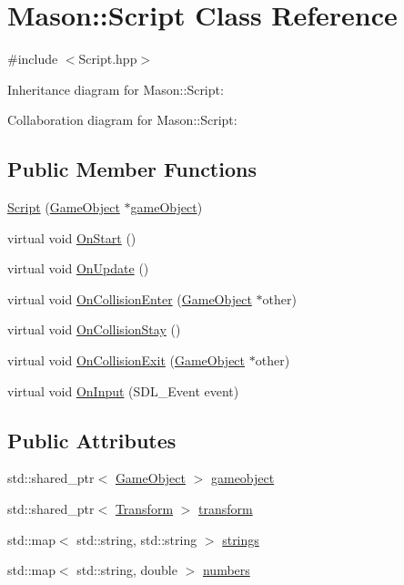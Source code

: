 \hypertarget{class_mason_1_1_script}{}\section{Mason\+:\+:Script Class Reference}
\label{class_mason_1_1_script}


{\ttfamily \#include $<$Script.\+hpp$>$}



Inheritance diagram for Mason\+:\+:Script\+:


Collaboration diagram for Mason\+:\+:Script\+:
\subsection*{Public Member Functions}
\begin{DoxyCompactItemize}
\item 
\hyperlink{class_mason_1_1_script_a11d07693e51f3e22894784a6ae7a761d}{Script} (\hyperlink{class_mason_1_1_game_object}{Game\+Object} $\ast$\hyperlink{class_mason_1_1_component_a30030370c35f5562cbbbb0927b0448c8}{game\+Object})
\item 
virtual void \hyperlink{class_mason_1_1_script_aa42915c752bb7f4623ca679b222edf2f}{On\+Start} ()
\item 
virtual void \hyperlink{class_mason_1_1_script_acafa4283460fb677484bb43ebec37743}{On\+Update} ()
\item 
virtual void \hyperlink{class_mason_1_1_script_a1088013d6edc47d74643aa48a7cbbbdf}{On\+Collision\+Enter} (\hyperlink{class_mason_1_1_game_object}{Game\+Object} $\ast$other)
\item 
virtual void \hyperlink{class_mason_1_1_script_a9649674f058f8e1b9229e93f3d9a34d7}{On\+Collision\+Stay} ()
\item 
virtual void \hyperlink{class_mason_1_1_script_a04d09648b7dba1bcb0a0ad3c3570e2f3}{On\+Collision\+Exit} (\hyperlink{class_mason_1_1_game_object}{Game\+Object} $\ast$other)
\item 
virtual void \hyperlink{class_mason_1_1_script_a84fff8072c4e8b56fb242b29f3491224}{On\+Input} (S\+D\+L\+\_\+\+Event event)
\end{DoxyCompactItemize}
\subsection*{Public Attributes}
\begin{DoxyCompactItemize}
\item 
std\+::shared\+\_\+ptr$<$ \hyperlink{class_mason_1_1_game_object}{Game\+Object} $>$ \hyperlink{class_mason_1_1_script_a26ffab9ad2a0f22cb6a3cba3029a985f}{gameobject}
\item 
std\+::shared\+\_\+ptr$<$ \hyperlink{class_mason_1_1_transform}{Transform} $>$ \hyperlink{class_mason_1_1_script_a480aa8b8f65245d51e41ceeaf9cab93a}{transform}
\item 
std\+::map$<$ std\+::string, std\+::string $>$ \hyperlink{class_mason_1_1_script_a96f691d0ccd8db2e3e95824e8579cc42}{strings}
\item 
std\+::map$<$ std\+::string, double $>$ \hyperlink{class_mason_1_1_script_aea1a14b7709c72400c5e1355f57234da}{numbers}
\end{DoxyCompactItemize}
